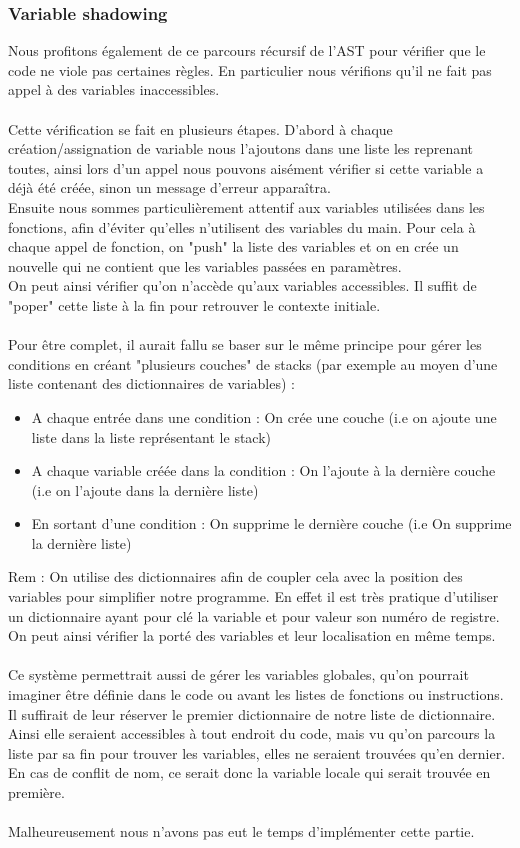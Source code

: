 \documentclass[a4paper,10pt]{article}
\begin{document}
	\subsubsection{Variable shadowing}
		Nous profitons également de ce parcours récursif de l'AST pour vérifier que le code ne viole pas certaines règles. En particulier nous vérifions qu'il ne fait pas appel à des variables inaccessibles.\\
		~\\
		Cette vérification se fait en plusieurs étapes. D'abord à chaque création/assignation de variable nous l'ajoutons dans une liste les reprenant toutes, ainsi lors d'un appel nous pouvons aisément vérifier si cette variable a déjà été créée, sinon un message d'erreur apparaîtra.\\
		Ensuite nous sommes particulièrement attentif aux variables utilisées dans les fonctions, afin d'éviter qu'elles n'utilisent des variables du main. Pour cela à chaque appel de fonction, on "push" la liste des variables et on en crée un nouvelle qui ne contient que les variables passées en paramètres.\\
		On peut ainsi vérifier qu'on n'accède qu'aux variables accessibles. Il suffit de "poper" cette liste à la fin pour retrouver le contexte initiale.\\
		~\\
		Pour être complet, il aurait fallu se baser sur le même principe pour gérer les conditions en créant "plusieurs couches" de stacks (par exemple au moyen d'une liste contenant des dictionnaires de variables) : \begin{itemize}
			\item A chaque entrée dans une condition : On crée une couche (i.e on ajoute une liste dans la liste représentant le stack)
			\item A chaque variable créée dans la condition : On l'ajoute à la dernière couche (i.e on l'ajoute dans la dernière liste)
			\item En sortant d'une condition : On supprime le dernière couche (i.e On supprime la dernière liste)
		\end{itemize}
		Rem : On utilise des dictionnaires afin de coupler cela avec la position des variables pour simplifier notre programme. En effet il est très pratique d'utiliser un dictionnaire ayant pour clé la variable et pour valeur son numéro de registre. On peut ainsi vérifier la porté des variables et leur localisation en même temps.\\
		~\\
		Ce système permettrait aussi de gérer les variables globales, qu'on pourrait imaginer être définie dans le code ou avant les listes de fonctions ou instructions. Il suffirait de leur réserver le premier dictionnaire de notre liste de dictionnaire. Ainsi elle seraient accessibles à tout endroit du code, mais vu qu'on parcours la liste par sa fin pour trouver les variables, elles ne seraient trouvées qu'en dernier. En cas de conflit de nom, ce serait donc la variable locale qui serait trouvée en première.\\
		~\\
		Malheureusement nous n'avons pas eut le temps d'implémenter cette partie.
\end{document}
